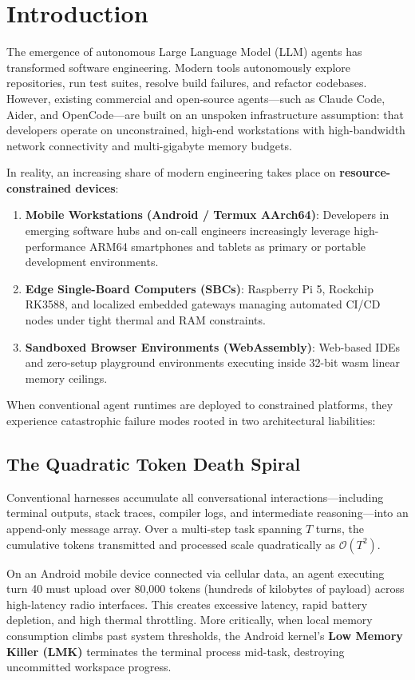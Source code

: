 \section{Introduction}
\label{sec:intro}

The emergence of autonomous Large Language Model (LLM) agents has transformed software engineering. Modern tools autonomously explore repositories, run test suites, resolve build failures, and refactor codebases. However, existing commercial and open-source agents—such as Claude Code, Aider, and OpenCode—are built on an unspoken infrastructure assumption: that developers operate on unconstrained, high-end workstations with high-bandwidth network connectivity and multi-gigabyte memory budgets.

In reality, an increasing share of modern engineering takes place on \textbf{resource-constrained devices}:
\begin{enumerate}
    \item \textbf{Mobile Workstations (Android / Termux AArch64)}: Developers in emerging software hubs and on-call engineers increasingly leverage high-performance ARM64 smartphones and tablets as primary or portable development environments.
    \item \textbf{Edge Single-Board Computers (SBCs)}: Raspberry Pi 5, Rockchip RK3588, and localized embedded gateways managing automated CI/CD nodes under tight thermal and RAM constraints.
    \item \textbf{Sandboxed Browser Environments (WebAssembly)}: Web-based IDEs and zero-setup playground environments executing inside 32-bit wasm linear memory ceilings.
\end{enumerate}

When conventional agent runtimes are deployed to constrained platforms, they experience catastrophic failure modes rooted in two architectural liabilities:

\subsection{The Quadratic Token Death Spiral}
Conventional harnesses accumulate all conversational interactions—including terminal outputs, stack traces, compiler logs, and intermediate reasoning—into an append-only message array. Over a multi-step task spanning $T$ turns, the cumulative tokens transmitted and processed scale quadratically as $\mathcal{O}(T^2)$. 

On an Android mobile device connected via cellular data, an agent executing turn 40 must upload over 80,000 tokens (hundreds of kilobytes of payload) across high-latency radio interfaces. This creates excessive latency, rapid battery depletion, and high thermal throttling. More critically, when local memory consumption climbs past system thresholds, the Android kernel's \textbf{Low Memory Killer (LMK)} terminates the terminal process mid-task, destroying uncommitted workspace progress.

